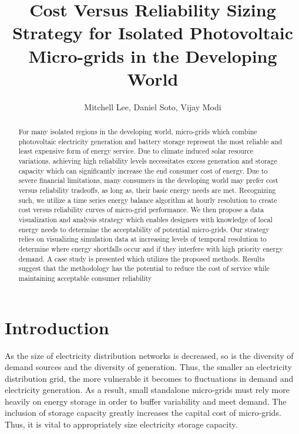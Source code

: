 \documentclass[11p]{article}
\title{Cost Versus Reliability Sizing Strategy for Isolated Photovoltaic Micro-grids in the Developing World}
\author{Mitchell Lee, Daniel Soto, Vijay Modi}
\date{}
\begin{document}
\maketitle

\begin{abstract}
For many isolated regions in the developing world, micro-grids which combine photovoltaic electricity generation and battery storage represent the most reliable and least expensive form of energy service. 
Due to climate induced solar resource variations, achieving high reliability levels necessitates excess generation and storage capacity which can significantly increase the end consumer cost of energy.
Due to severe financial limitations, many consumers in the developing world may prefer cost versus reliability tradeoffs, as long as, their basic energy needs are met. 
Recognizing such, we utilize a time series energy balance algorithm at hourly resolution to create cost versus reliability curves of micro-grid performance. 
We then propose a data visualization and analysis strategy which enables designers with knowledge of local energy needs to determine the acceptability of potential micro-grids.  
Our strategy relies on visualizing simulation data at increasing levels of temporal resolution to determine where energy shortfalls occur and if they interfere with high priority energy demand. 
A case study is presented which utilizes the proposed methods.
Results suggest that the methodology has the potential to reduce the cost of service while maintaining acceptable consumer reliability


\end{abstract}

\section{Introduction}

As the size of electricity distribution networks is decreased, so is the diversity of demand sources and the diversity of generation.
Thus, the smaller an electricity distribution grid, the more vulnerable it becomes to fluctuations in demand and electricity generation.
As a result, small standalone micro-grids must rely more heavily on energy storage in order to buffer variability and meet demand.  
The inclusion of storage capacity greatly increases the capital cost of micro-grids.
Thus, it is vital to appropriately size electricity storage capacity.
\end{document}
